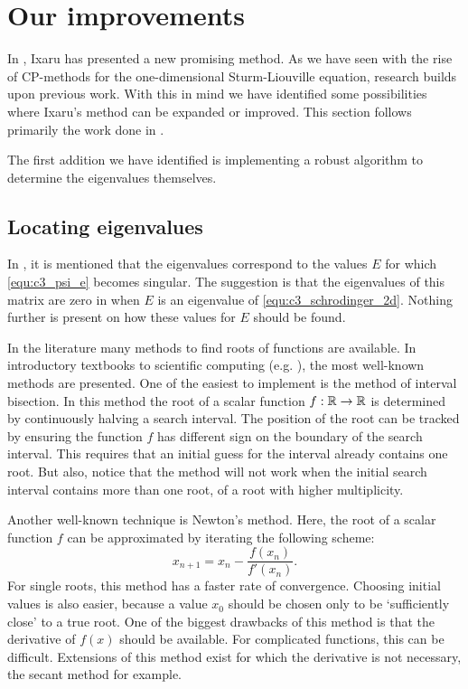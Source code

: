 \section{Our improvements}

In \cite{ixaru_new_2010}, Ixaru has presented a new promising method. As we have seen with the rise of CP-methods for the one-dimensional Sturm-Liouville equation, research builds upon previous work. With this in mind we have identified some possibilities where Ixaru's method can be expanded or improved. This section follows primarily the work done in \cite{baeyens_fast_2020}.

The first addition we have identified is implementing a robust algorithm to determine the eigenvalues themselves.

\subsection{Locating eigenvalues}\label{sec:c3_locating_e}

In \cite{ixaru_new_2010}, it is mentioned that the eigenvalues correspond to the values $E$ for which \eqref{equ:c3_psi_e} becomes singular. The suggestion is that the eigenvalues of this matrix are zero in when $E$ is an eigenvalue of \eqref{equ:c3_schrodinger_2d}. Nothing further is present on how these values for $E$ should be found.

In the literature many methods to find roots of functions are available. In introductory textbooks to scientific computing (e.g. \cite[Chapter~5]{heath_scientific_2002}), the most well-known methods are presented. One of the easiest to implement is the method of interval bisection. In this method the root of a scalar function $f : \mathbb{R} \to \mathbb{R}$ is determined by continuously halving a search interval. The position of the root can be tracked by ensuring the function $f$ has different sign on the boundary of the search interval. This requires that an initial guess for the interval already contains one root. But also, notice that the method will not work when the initial search interval contains more than one root, of a root with higher multiplicity.

Another well-known technique is Newton's method. Here, the root of a scalar function $f$ can be approximated by iterating the following scheme:
$$
    x_{n+1} = x_n - \frac{f(x_n)}{f'(x_n)}\text{.}
$$
For single roots, this method has a faster rate of convergence. Choosing initial values is also easier, because a value $x_0$ should be chosen only to be `sufficiently close' to a true root. One of the biggest drawbacks of this method is that the derivative of $f(x)$ should be available. For complicated functions, this can be difficult. Extensions of this method exist for which the derivative is not necessary, the secant method for example.

